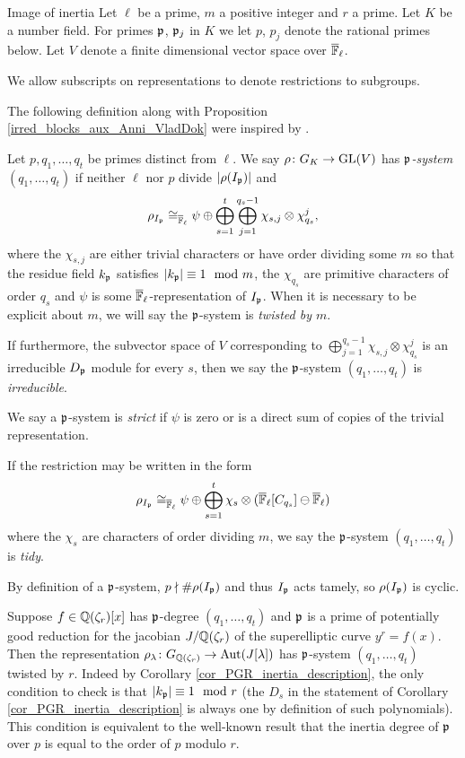 \documentclass[11pt,a4paper]{article}
\newcommand{\Qr}{{\QQ(\zeta_r)}}
\newcommand{\GQr}{G_{\QQ(\zeta_{r})}}
\begin{document}
\begin{section}{Image of inertia}
\label{section_image_of_inertia}
Let $\ell$ be a prime, $m$ a positive integer and $r$ a prime. Let $K$ be a number field. For primes $\mathfrak{p}$, $\mathfrak{p}_j$ in $K$ we let $p$, $p_j$ denote the rational primes below.
Let $V$ denote a finite dimensional vector space over ${\overline{\mathbb{F}}_\ell}$. 

We allow subscripts on representations to denote restrictions to subgroups.

The following definition along with Proposition \ref{irred_blocks_aux_Anni_VladDok} were inspired by \cite[Proposition 3.1]{Anni_VDok}.

\begin{definition}
Let $p,q_1, \ldots, q_t$ be primes distinct from $\ell$. We say $\rho\colon \GK \rightarrow \GL(V)$ has \emph{$\mathfrak{p}$-system $(q_1, \ldots, q_t)$} if
 neither $\ell$ nor $p$ divide  $|\rho(I_{\mathfrak{p}})|$ and
$$\rho_{I_{\mathfrak{p}}} \cong_{{\overline{\mathbb{F}}_\ell}} \psi \oplus \bigoplus_{s=1}^{t} \bigoplus_{j=1}^{q_s-1} \chi_{s,j} \otimes \chi_{q_s}^{j},$$
where the $\chi_{s,j}$ are either trivial characters or have order dividing some $m$ so that the residue field $k_{\mathfrak{p}}$ satisfies $|k_{\mathfrak{p}}| \equiv 1 \mod{m}$, the $\chi_{q_s}$ are primitive characters of order $q_s$ and $\psi$ is some ${\overline{\mathbb{F}}_\ell}$-representation of $I_{\mathfrak{p}}$.
When it is necessary to be explicit about $m$, we will say the $\mathfrak{p}$-system is \emph{twisted by $m$}.

If furthermore, the subvector space of $V$ corresponding to $\bigoplus_{j=1}^{q_s-1} \chi_{s,j} \otimes \chi_{q_s}^{j}$ is an irreducible $D_{\mathfrak{p}}$ module for every $s$, then we say the $\mathfrak{p}$-system $(q_1, \ldots, q_t)$ is \emph{irreducible}.

We say a $\mathfrak{p}$-system is \emph{strict} if $\psi$ is zero or is a direct sum of copies of the trivial representation.

If the restriction may be written in the form \[\rho_{I_{\mathfrak{p}}} \cong_{{\overline{\mathbb{F}}_\ell}} \psi \oplus \bigoplus_{s=1}^{t} \chi_{s} \otimes ({\overline{\mathbb{F}}_\ell}[C_{q_s}] \ominus {\ensuremath{\overline{\mathbb{F}}_\ell}})
\]
where the $\chi_{s}$ are characters of order dividing $m$, we say the $\mathfrak{p}$-system $(q_1, \ldots, q_t)$ is \emph{tidy}.
\end{definition}

\begin{remark}
By definition of a $\mathfrak{p}$-system, $p \nmid \#\rho(I_{\mathfrak{p}})$ and thus $I_{\mathfrak{p}}$ acts tamely, so $\rho(I_{\mathfrak{p}})$ is cyclic. 
\end{remark}

\begin{remark}
Suppose $f \in \Qr[x]$ has $\mathfrak{p}$-degree $(q_1,\ldots,q_t)$ and $\mathfrak{p}$ is a prime of potentially good reduction for the jacobian $J/\Qr$ of the superelliptic curve $y^r=f(x)$.
Then the representation $\rho_\lambda \colon \GQr \rightarrow \Aut(J[\lambda])$ has $\mathfrak{p}$-system $(q_1,\ldots,q_t)$ twisted by $r$.
Indeed by Corollary \ref{cor_PGR_inertia_description}, the only condition to check is that $|k_{\mathfrak{p}}|\equiv 1 \mod{r}$ (the $D_s$ in the statement of Corollary \ref{cor_PGR_inertia_description} is always one by definition of such polynomials).
This condition is equivalent to the well-known result that the inertia degree of $\mathfrak{p}$ over $p$ is equal to the order of $p$ modulo $r$.
\end{remark}


\end{section}
\end{document}
